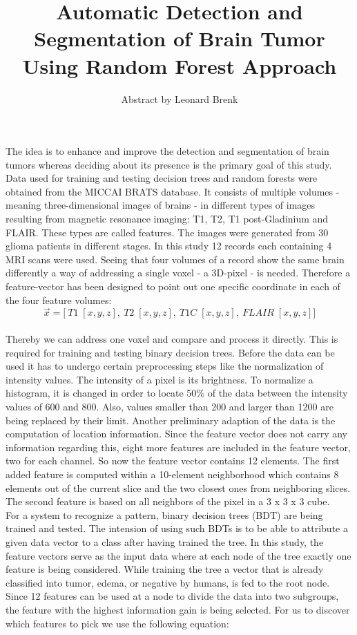\documentclass{article}
\title{Automatic Detection and Segmentation of Brain Tumor Using Random Forest Approach}
\author{Abstract by Leonard Brenk}
\begin{document}
 \maketitle

 The idea is to enhance and improve the detection and segmentation of brain tumors whereas deciding about its presence is the primary goal of this study. Data used for training and testing decision trees and random forests were obtained from the MICCAI BRATS database. It consists of multiple volumes - meaning three-dimensional images of brains - in different types of images resulting from magnetic resonance imaging: T1, T2, T1 post-Gladinium and FLAIR. These types are called features. The images were generated from 30 glioma patients in different stages. In this study 12 records each containing 4 MRI scans were used. Seeing that four volumes of a record show the same brain differently a way of addressing a single voxel - a 3D-pixel - is needed. Therefore a feature-vector has been designed to point out one specific coordinate in each of the four feature volumes:\\

 \[ \vec{x} = \bigg[ \: T1\; [x,y,z], \: T2\; [x,y,z], \: T1C\; [x,y,z],\: FLAIR\; [x,y,z] \bigg] \]\\

 Thereby we can address one voxel and compare and process it directly. This is required for training and testing binary decision trees. Before the data can be used it has to undergo certain preprocessing steps like the normalization of intensity values. The intensity of a pixel is its brightness. To normalize a histogram, it is changed in order to locate 50\% of the data between the intensity values of 600 and 800. Also, values smaller than 200 and larger than 1200 are being replaced by their limit. Another preliminary adaption of the data is the computation of location information. Since the feature vector does not carry any information regarding this, eight more features are included in the feature vector, two for each channel. So now the feature vector contains 12 elements. The first added feature is computed within a 10-element neighborhood which contains 8 elements out of the current slice and the two closest ones from neighboring slices. The second feature is based on all neighbors of the pixel in a 3 x 3 x 3 cube.\\


  For a system to recognize a pattern, binary decision trees (BDT) are being trained and tested. The intension of using such BDTs is to be able to attribute a given data vector to a class after having trained the tree. In this study, the feature vectors serve as the input data where at each node of the tree exactly one feature is being considered. While training the tree a vector that is already classified into tumor, edema, or negative by humans, is fed to the root node. Since 12 features can be used at a node to divide the data into two subgroups, the feature with the highest information gain is being selected. For us to discover which features to pick we use the following equation:
\end{document}
